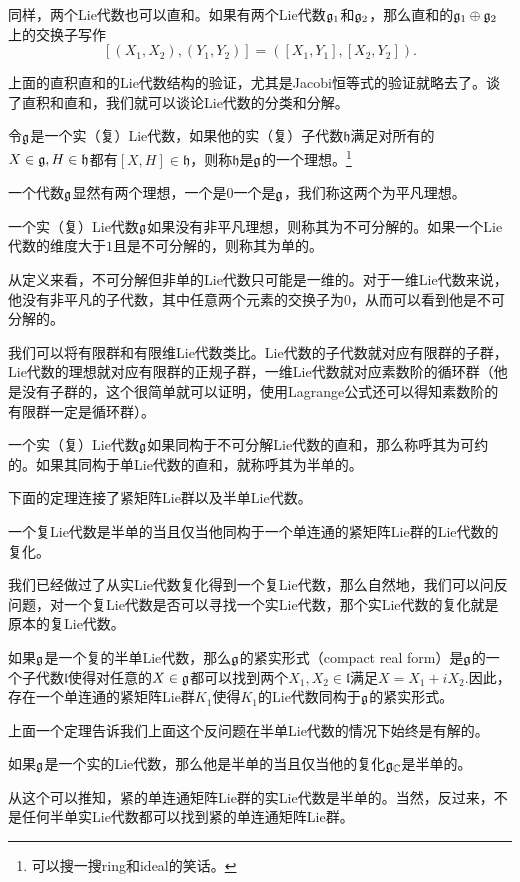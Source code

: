 同样，两个Lie代数也可以直和。如果有两个Lie代数${\mathfrak{g}}_1$和${\mathfrak{g}}_2$，那么直和的${\mathfrak{g}}_1\oplus{\mathfrak{g}}_2$上的交换子写作
\[
	[(X_1,X_2),(Y_1,Y_2)]=([X_1,Y_1],[X_2,Y_2]).
\]

上面的直积直和的Lie代数结构的验证，尤其是Jacobi恒等式的验证就略去了。谈了直积和直和，我们就可以谈论Lie代数的分类和分解。

\para 令${\mathfrak{g}}$是一个实（复）Lie代数，如果他的实（复）子代数$\mathfrak{h}$满足对所有的$X\in {\mathfrak{g}},H \in \mathfrak{h}$都有$[X,H]\in \mathfrak{h}$，则称$\mathfrak{h}$是${\mathfrak{g}}$的一个理想。\footnote{可以搜一搜ring和ideal的笑话。}

一个代数${\mathfrak{g}}$显然有两个理想，一个是$0$一个是${\mathfrak{g}}$，我们称这两个为平凡理想。

\para 一个实（复）Lie代数${\mathfrak{g}}$如果没有非平凡理想，则称其为不可分解的。如果一个Lie代数的维度大于$1$且是不可分解的，则称其为单的。

从定义来看，不可分解但非单的Lie代数只可能是一维的。对于一维Lie代数来说，他没有非平凡的子代数，其中任意两个元素的交换子为0，从而可以看到他是不可分解的。

我们可以将有限群和有限维Lie代数类比。Lie代数的子代数就对应有限群的子群，Lie代数的理想就对应有限群的正规子群，一维Lie代数就对应素数阶的循环群（他是没有子群的，这个很简单就可以证明，使用Lagrange公式还可以得知素数阶的有限群一定是循环群）。

\para 一个实（复）Lie代数${\mathfrak{g}}$如果同构于不可分解Lie代数的直和，那么称呼其为可约的。如果其同构于单Lie代数的直和，就称呼其为半单的。

下面的定理连接了紧矩阵Lie群以及半单Lie代数。

\theo 一个复Lie代数是半单的当且仅当他同构于一个单连通的紧矩阵Lie群的Lie代数的复化。

我们已经做过了从实Lie代数复化得到一个复Lie代数，那么自然地，我们可以问反问题，对一个复Lie代数是否可以寻找一个实Lie代数，那个实Lie代数的复化就是原本的复Lie代数。

\para 如果${\mathfrak{g}}$是一个复的半单Lie代数，那么${\mathfrak{g}}$的紧实形式（compact real form）是${\mathfrak{g}}$的一个子代数$\mathfrak{l}$使得对任意的$X\in{\mathfrak{g}}$都可以找到两个$X_1,X_2\in\mathfrak{l}$满足$X=X_1+iX_2$.因此，存在一个单连通的紧矩阵Lie群$K_1$使得$K_1$的Lie代数同构于${\mathfrak{g}}$的紧实形式。

上面一个定理告诉我们上面这个反问题在半单Lie代数的情况下始终是有解的。

\pro 如果${\mathfrak{g}}$是一个实的Lie代数，那么他是半单的当且仅当他的复化${\mathfrak{g}}_{\mathbb{C}}$是半单的。

从这个可以推知，紧的单连通矩阵Lie群的实Lie代数是半单的。当然，反过来，不是任何半单实Lie代数都可以找到紧的单连通矩阵Lie群。

